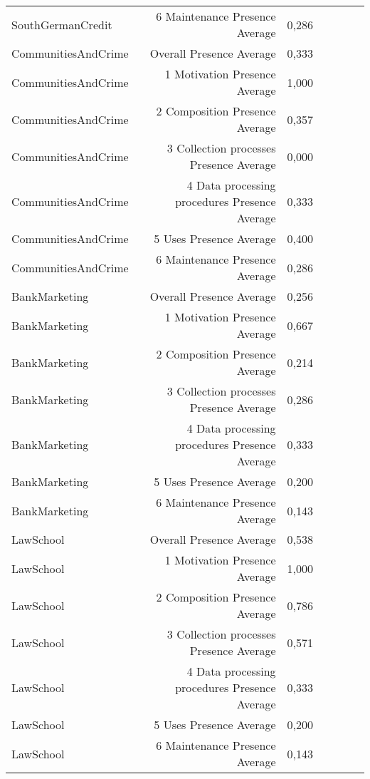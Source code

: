 \begin{table}[t]
\begin{tabular}{|p{2cm}|r|r|r|r|r|r|}
SouthGermanCredit & 6 Maintenance Presence Average & 0,286\cellcolor[HTML]{FCB19A}\\
CommunitiesAndCrime & Overall Presence Average & 0,333\cellcolor[HTML]{FCB6A0}\\
CommunitiesAndCrime & 1 Motivation Presence Average & 1,000\cellcolor[HTML]{FFFFFF}\\
CommunitiesAndCrime & 2 Composition Presence Average & 0,357\cellcolor[HTML]{FDB8A4}\\
CommunitiesAndCrime & 3 Collection processes Presence Average & 0,000\cellcolor[HTML]{FC9272}\\
CommunitiesAndCrime & 4 Data processing procedures Presence Average & 0,333\cellcolor[HTML]{FCB6A0}\\
CommunitiesAndCrime & 5 Uses Presence Average & 0,400\cellcolor[HTML]{FDBDAA}\\
CommunitiesAndCrime & 6 Maintenance Presence Average & 0,286\cellcolor[HTML]{FCB19A}\\
BankMarketing & Overall Presence Average & 0,256\cellcolor[HTML]{FCAD96}\\
BankMarketing & 1 Motivation Presence Average & 0,667\cellcolor[HTML]{FEDAD0}\\
BankMarketing & 2 Composition Presence Average & 0,214\cellcolor[HTML]{FCA990}\\
BankMarketing & 3 Collection processes Presence Average & 0,286\cellcolor[HTML]{FCB19A}\\
BankMarketing & 4 Data processing procedures Presence Average & 0,333\cellcolor[HTML]{FCB6A0}\\
BankMarketing & 5 Uses Presence Average & 0,200\cellcolor[HTML]{FCA78E}\\
BankMarketing & 6 Maintenance Presence Average & 0,143\cellcolor[HTML]{FCA186}\\
LawSchool & Overall Presence Average & 0,538\cellcolor[HTML]{FDCCBD}\\
LawSchool & 1 Motivation Presence Average & 1,000\cellcolor[HTML]{FFFFFF}\\
LawSchool & 2 Composition Presence Average & 0,786\cellcolor[HTML]{FEE7E0}\\
LawSchool & 3 Collection processes Presence Average & 0,571\cellcolor[HTML]{FDD0C2}\\
LawSchool & 4 Data processing procedures Presence Average & 0,333\cellcolor[HTML]{FCB6A0}\\
LawSchool & 5 Uses Presence Average & 0,200\cellcolor[HTML]{FCA78E}\\
LawSchool & 6 Maintenance Presence Average & 0,143\cellcolor[HTML]{FCA186}\\

\end{tabular}
\end{table}

